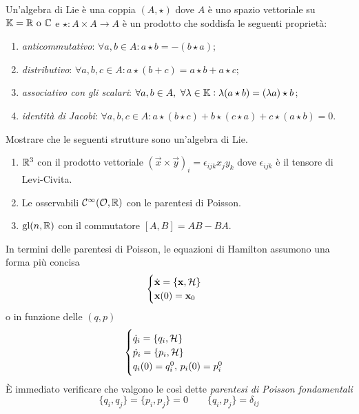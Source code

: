 \begin{definition}
    Un'algebra di Lie è una coppia $ (A, \star) $ dove $ A $ è uno spazio vettoriale su $ \mathbb{K} = \mathbb{R} \text{ o } \mathbb{C} $ e $ \star \colon A \times A \to A $ è un prodotto che soddisfa le seguenti proprietà:
    \begin{enumerate}[label=(\roman*)]
        \item \emph{anticommutativo}: $ \forall a, b \in A : a \star b = - (b \star a) $;
        \item \emph{distributivo}: $ \forall a, b, c \in A : a \star (b + c) = a \star b + a \star c $;
        \item \emph{associativo con gli scalari}: $ \forall a, b \in A, \ \forall \lambda \in \mathbb{K} : \lambda (a \star b) = (\lambda a) \star b $;
        \item \emph{identità di Jacobi}: $ \forall a, b, c \in A : a \star (b \star c) + b \star (c \star a) + c \star (a \star b) = 0 $.
    \end{enumerate}
\end{definition}

\begin{exercise}
    Mostrare che le seguenti strutture sono un'algebra di Lie.
    \begin{enumerate}
        \item $ \mathbb{R}^3 $ con il prodotto vettoriale $ (\vec{x} \times \vec{y})_i = \epsilon_{ijk} x_j y_k $ dove $ \epsilon_{ijk} $ è il tensore di Levi-Civita.
        \item Le osservabili $ \mathcal{C}^\infty(\mathcal{O}, \mathbb{R}) $ con le parentesi di Poisson.
        \item $ \mathrm{gl}(n, \mathbb{R}) $ con il commutatore $ [A, B] = AB - BA $.
    \end{enumerate}
\end{exercise}

In termini delle parentesi di Poisson, le equazioni di Hamilton assumono una forma più concisa
\begin{equation}
    \begin{cases}
        \dot{\mathbf{x}} = \{\mathbf{x}, \mathcal{H}\} \\
        \mathbf{x}(0) = \mathbf{x}_0
    \end{cases}
\end{equation}
o in funzione delle $ (q, p) $
\begin{equation}
    \begin{cases}
    \dot{q}_i = \{q_i, \mathcal{H}\} \\
    \dot{p}_i = \{p_i, \mathcal{H}\} \\
    q_i(0) = q_i^0, \, p_i(0) = p_i^0
    \end{cases}
\end{equation}
È immediato verificare che valgono le così dette \emph{parentesi di Poisson fondamentali}
\begin{equation}
    \{q_i, q_j\} = \{p_i, p_j\} = 0 \qquad \{q_i, p_j\} = \delta_{ij}
\end{equation}

